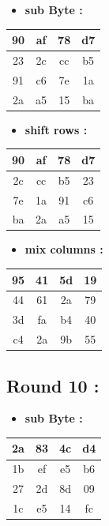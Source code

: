 \documentclass{article}
\begin{document}
\begin{itemize}
    \item \textbf{sub Byte :}
\end{itemize} \begin{tabular}{|c|c|c|c|}
\hline 90 & af & 78 & d7 \\ \hline 23 & 2c & cc & b5 \\ \hline 91 & c6 & 7e & 1a \\ \hline 2a & a5 & 15 & ba \\ \hline \end{tabular}\hspace{0.5cm}\vspace{0.1cm}\begin{itemize}
    \item \textbf{shift rows :}
\end{itemize} \begin{tabular}{|c|c|c|c|}
\hline 90 & af & 78 & d7 \\ \hline 2c & cc & b5 & 23 \\ \hline 7e & 1a & 91 & c6 \\ \hline ba & 2a & a5 & 15 \\ \hline \end{tabular}\hspace{0.5cm}\vspace{0.1cm}\begin{itemize}
    \item \textbf{mix columns :}
\end{itemize} \begin{tabular}{|c|c|c|c|}
\hline 95 & 41 & 5d & 19 \\ \hline 44 & 61 & 2a & 79 \\ \hline 3d & fa & b4 & 40 \\ \hline c4 & 2a & 9b & 55 \\ \hline \end{tabular}\hspace{0.5cm}\vspace{0.1cm}\subsection*{Round 10 : }\begin{itemize}
    \item \textbf{sub Byte :}
\end{itemize} \begin{tabular}{|c|c|c|c|}
\hline 2a & 83 & 4c & d4 \\ \hline 1b & ef & e5 & b6 \\ \hline 27 & 2d & 8d & 09 \\ \hline 1c & e5 & 14 & fc \\ \hline \end{tabular}\hspace{0.5cm}\vspace{0.1cm}\begin{itemize}

\end{itemize}
\end{document}
